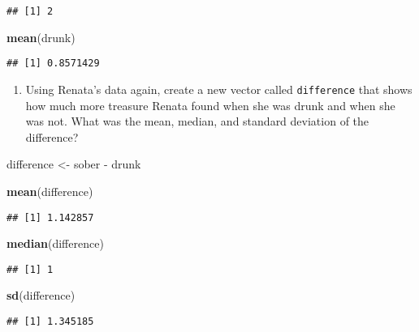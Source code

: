 \documentclass[]{book}
\newenvironment{Shaded}{\begin{snugshade}}{\end{snugshade}}
\newcommand{\KeywordTok}[1]{\textcolor[rgb]{0.13,0.29,0.53}{\textbf{{#1}}}}
\newcommand{\StringTok}[1]{\textcolor[rgb]{0.31,0.60,0.02}{{#1}}}
\newcommand{\NormalTok}[1]{{#1}}
\providecommand{\tightlist}{%
  \setlength{\itemsep}{0pt}\setlength{\parskip}{0pt}}
\begin{document}
\begin{verbatim}
## [1] 2
\end{verbatim}

\begin{Shaded}
\begin{Highlighting}[]
\KeywordTok{mean}\NormalTok{(drunk)}
\end{Highlighting}
\end{Shaded}

\begin{verbatim}
## [1] 0.8571429
\end{verbatim}

\begin{enumerate}
\def\labelenumi{\arabic{enumi}.}
\setcounter{enumi}{2}
\tightlist
\item
  Using Renata's data again, create a new vector called
  \texttt{difference} that shows how much more treasure Renata found
  when she was drunk and when she was not. What was the mean, median,
  and standard deviation of the difference?
\end{enumerate}

\begin{Shaded}
\begin{Highlighting}[]
\NormalTok{difference <-}\StringTok{ }\NormalTok{sober -}\StringTok{ }\NormalTok{drunk}

\KeywordTok{mean}\NormalTok{(difference)}
\end{Highlighting}
\end{Shaded}

\begin{verbatim}
## [1] 1.142857
\end{verbatim}

\begin{Shaded}
\begin{Highlighting}[]
\KeywordTok{median}\NormalTok{(difference)}
\end{Highlighting}
\end{Shaded}

\begin{verbatim}
## [1] 1
\end{verbatim}

\begin{Shaded}
\begin{Highlighting}[]
\KeywordTok{sd}\NormalTok{(difference)}
\end{Highlighting}
\end{Shaded}

\begin{verbatim}
## [1] 1.345185
\end{verbatim}
\end{document}
